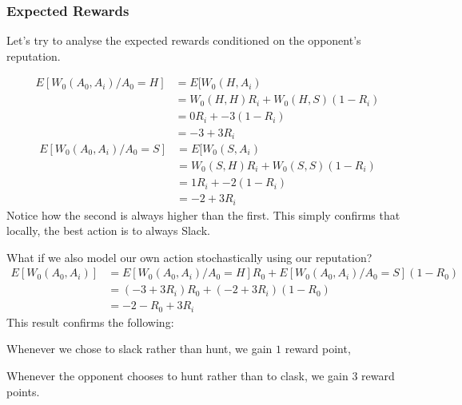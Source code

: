 \documentclass[10pt,fleqn]{article}
\begin{document}
\subsubsection{Expected Rewards}

Let's try to analyse the expected rewards conditioned on the opponent's
reputation.

\begin{align*}
  E[W_0(A_0, A_i) / A_0 = H] &= E[W_0(H, A_i) \\
                             &= W_0(H, H) R_i + W_0(H, S) (1-R_i)\\
                             &= 0 R_i + -3 (1-R_i) \\
                             &= -3 + 3 R_i
\end{align*}
\begin{align*}
  E[W_0(A_0, A_i) / A_0 = S] &= E[W_0(S, A_i) \\
                             &= W_0(S, H) R_i + W_0(S, S) (1-R_i) \\
                             &= 1 R_i + -2 (1-R_i) \\
                             &= -2 + 3 R_i
\end{align*}
Notice how the second is always higher than the first. This simply confirms that
locally, the best action is to always Slack.

What if we also model our own action stochastically using our reputation?
\begin{align*}
  E[W_0(A_0, A_i)] &= E[W_0(A_0, A_i) / A_0 = H] R_0 + E[W_0(A_0, A_i) / A_0 = S] (1-R_0) \\
                   &= (-3 +3 R_i) R_0 + (-2 +3 R_i) (1-R_0) \\
                   &= -2 - R_0 + 3 R_i
\end{align*}
This result confirms the following:
\begin{inlist}
  \item Whenever we chose to slack rather than hunt, we gain $1$ reward point,
  \item Whenever the opponent chooses to hunt rather than to clask, we gain $3$
    reward points.
\end{inlist}
\end{document}

